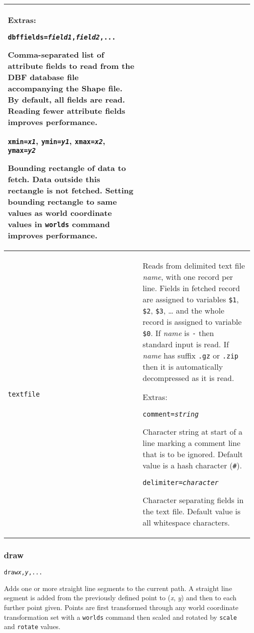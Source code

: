 \begin{longtable}{|p{3cm}|p{10cm}|}
\vspace{10pt}
Extras:

\texttt{dbffields=\textit{field1},\textit{field2},...}

Comma-separated list of
attribute fields to read from the DBF database file accompanying the
Shape file.  By default, all fields are read.  Reading fewer attribute
fields improves performance.

\vspace{10pt}
\texttt{xmin=\textit{x1}},
\texttt{ymin=\textit{y1}},
\texttt{xmax=\textit{x2}},
\texttt{ymax=\textit{y2}}

Bounding rectangle of data to fetch.  Data outside this rectangle is
not fetched.  Setting bounding rectangle to same values as world
coordinate values in \texttt{worlds} command improves performance. \\

\hline

\texttt{textfile} &
Reads from delimited text file \textit{name}, with one
record per line.  Fields in fetched record
are assigned to variables
\texttt{\$1}, \texttt{\$2}, \texttt{\$3}, \dots
and the whole record is assigned to variable
\texttt{\$0}.
If \textit{name} is \texttt{-} then standard input is read.
If \textit{name} has suffix \texttt{.gz} or \texttt{.zip}
then it is automatically decompressed as it is read.

\vspace{10pt}
Extras:

\texttt{comment=\textit{string}}

Character string at start of a line marking a comment line that
is to be ignored.  Default value is a hash character (\texttt{\#}).

\vspace{10pt}
\texttt{delimiter=\textit{character}}

Character separating fields in the text file.  Default value
is all whitespace characters. \\

\end{longtable}

\subsubsection{draw}

\begin{alltt}
draw \textit{x}, \textit{y}, ...
\end{alltt}

Adds one or more straight line segments to the current path.
A straight line segment is added from the previously defined point
to (\textit{x}, \textit{y}) and then to each further point given.
Points are first transformed through any world coordinate
transformation set with a \texttt{worlds} command
then scaled and rotated by \texttt{scale}
and \texttt{rotate} values.

